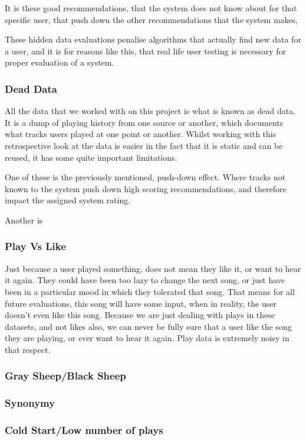 \documentclass[12pt]{article}
\begin{document}
		It is these good recommendations, that the system does not know about for that specific user, that push down the other recommendations that the system makes, 
		
		 These hidden data evaluations penalise algorithms that actually find new data for a user, and it is for reasons like this, that real  life user testing is necessary for proper evaluation of a system.
		


		\subsubsection{Dead Data}
All the data that we worked with on this project is what is known as dead data. It is a dump of playing history from one source or another, which documents what tracks users played at one point or another. Whilst working with this retrospective look at the data is easier in the fact that it is static and can be reused, it has some quite important limitations. 

One of these is the previously mentioned, push-down effect. Where tracks not known to the system push down high scoring recommendations, and therefore impact the assigned system rating. 

Another is 
		\subsubsection{Play Vs Like}
		 Just because a user played something, does not mean they like it, or want to hear it again. They could have been too lazy to change the next song, or just have been in a particular mood in which they tolerated that song. That means for all future evaluations, this song will have some input, when in reality, the user doesn’t even like this song. Because we are just dealing with plays in these datasets, and not likes also, we can never be fully sure that a user like the song they are playing, or ever want to hear it again. Play data is extremely noisy in that respect.
		 \subsubsection{Gray Sheep/Black Sheep}
		 
		 \subsubsection{Synonymy}
		 
		 \subsubsection{Cold Start/Low number of plays} 
\end{document}

